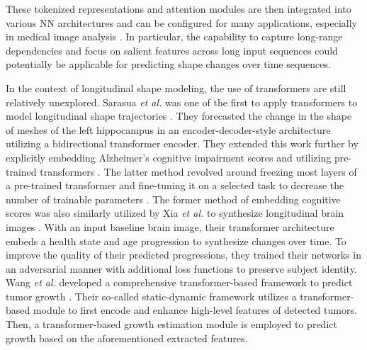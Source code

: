 		These tokenized representations and attention modules are then integrated into various NN architectures and can be configured for many applications, especially in medical image analysis \cite{Azad2024}. In particular, the capability to capture long-range dependencies and focus on salient features across long input sequences could potentially be applicable for predicting shape changes over time sequences. 
		
		In the context of longitudinal shape modeling, the use of transformers are still relatively unexplored. Sarasua \textit{et al.} was one of the first to apply transformers to model longitudinal shape trajectories \cite{Sarasua2021}. They forecasted the change in the shape of meshes of the left hippocampus in an encoder-decoder-style architecture utilizing a bidirectional transformer encoder. They extended this work further by explicitly embedding Alzheimer's cognitive impairment scores and utilizing pre-trained transformers \cite{Sarasua2022}. The latter method revolved around freezing most layers of a pre-trained transformer and fine-tuning it on a selected task to decrease the number of trainable parameters \cite{Lu2021}. The former method of embedding cognitive scores was also similarly utilized by Xia \textit{et al.} to synthesize longitudinal brain images \cite{Xia2021}. With an input baseline brain image, their transformer architecture embeds a health state and age progression to synthesize changes over time. To improve the quality of their predicted progressions, they trained their networks in an adversarial manner with additional loss functions to preserve subject identity. Wang \textit{et al.} developed a comprehensive transformer-based framework to predict tumor growth \cite{Wang2022}. Their so-called static-dynamic framework utilizes a transformer-based module to first encode and enhance high-level features of detected tumors. Then, a transformer-based growth estimation module is employed to predict growth based on the aforementioned extracted features. 
		
